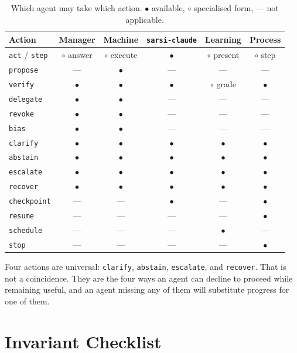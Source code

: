 \documentclass[11pt]{article}
\newcommand{\code}[1]{\texttt{\small #1}}
\begin{document}
\begin{table}[h]
\centering\footnotesize
\caption{Which agent may take which action. $\bullet$ available, $\circ$ specialised form, --- not applicable.}
\label{tab:actionmatrix}
\begin{tabular}{@{}L{3.0cm}ccccc@{}}
\toprule
\textbf{Action} & \textbf{Manager} & \textbf{Machine} & \textbf{\code{sarsi-claude}} & \textbf{Learning} & \textbf{Process} \\
\midrule
\code{act} / \code{step} & $\circ$ answer & $\circ$ execute & $\bullet$ & $\circ$ present & $\circ$ step \\
\code{propose} & --- & $\bullet$ & --- & --- & --- \\
\code{verify} & $\bullet$ & $\bullet$ & $\bullet$ & $\circ$ grade & $\bullet$ \\
\code{delegate} & $\bullet$ & $\bullet$ & --- & --- & --- \\
\code{revoke} & $\bullet$ & $\bullet$ & --- & --- & --- \\
\code{bias} & $\bullet$ & $\bullet$ & --- & --- & --- \\
\code{clarify} & $\bullet$ & $\bullet$ & $\bullet$ & $\bullet$ & $\bullet$ \\
\code{abstain} & $\bullet$ & $\bullet$ & $\bullet$ & $\bullet$ & $\bullet$ \\
\code{escalate} & $\bullet$ & $\bullet$ & $\bullet$ & $\bullet$ & $\bullet$ \\
\code{recover} & $\bullet$ & $\bullet$ & $\bullet$ & $\bullet$ & $\bullet$ \\
\code{checkpoint} & --- & --- & $\bullet$ & --- & $\bullet$ \\
\code{resume} & --- & --- & --- & --- & $\bullet$ \\
\code{schedule} & --- & --- & --- & $\bullet$ & --- \\
\code{stop} & --- & --- & --- & --- & $\bullet$ \\
\bottomrule
\end{tabular}
\end{table}

Four actions are universal: \code{clarify}, \code{abstain}, \code{escalate}, and \code{recover}. That is not a coincidence. They are the four ways an agent can decline to proceed while remaining useful, and an agent missing any of them will substitute progress for one of them.

\section{Invariant Checklist}
\label{app:invariants}
\end{document}
